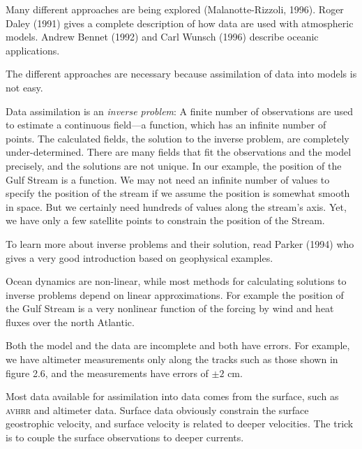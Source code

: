 Many different approaches are being explored (Malanotte-Rizzoli,
1996). Roger Daley (1991) gives a complete description of how data are
used with atmospheric models. Andrew Bennet (1992) and Carl Wunsch
(1996) describe oceanic applications.

The different approaches are necessary because assimilation of data into models is not easy.
\begin{enumerate}
\vitem Data assimilation is an
\textit{inverse problem}: A finite
number of observations are used to estimate a continuous field---a
function, which has an infinite number of points. The calculated
fields, the solution to the inverse problem, are completely
under-determined. There are many fields that fit the observations and
the model precisely, and the solutions are not unique. In our example,
the position of the Gulf Stream is a
function. We may not need an infinite number of values to specify the
position of the stream if we assume the position is somewhat smooth in
space. But we certainly need hundreds of values along the stream's
axis. Yet, we have only a few satellite points to constrain the
position of the Stream.

To learn more about inverse problems and their solution, read Parker
(1994) who gives a very good introduction based on geophysical
examples.

\vitem Ocean dynamics are non-linear, while most methods for
calculating solutions to inverse problems depend on linear
approximations. For example the position of the Gulf Stream is a very nonlinear function of the forcing by
wind and heat fluxes over the north Atlantic.

\vitem Both the model and the data are incomplete and both have
errors. For example, we have altimeter measurements only along the
tracks such as those shown in figure 2.6, and the measurements have
errors of $\pm 2$ cm.

\vitem Most data available for assimilation
into data comes from the surface, such as \textsc{avhrr}
and altimeter
data. Surface data obviously constrain the surface geostrophic
velocity, and surface velocity is related to deeper velocities. The
trick is to couple the surface observations to deeper currents.
\end{enumerate}

